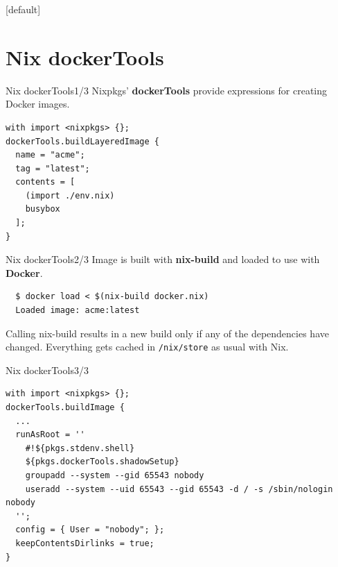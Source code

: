 \documentclass[12pt,aspectratio=169]{beamer}
\begin{document}

[default]


\section{Nix dockerTools}


\begin{frame}[fragile]{Nix dockerTools\hfill1/3}
  Nixpkgs' \textbf{dockerTools} provide expressions for creating Docker images.
  \begin{verbatim}
with import <nixpkgs> {};
dockerTools.buildLayeredImage {
  name = "acme";
  tag = "latest";
  contents = [
    (import ./env.nix)
    busybox
  ];
}
  \end{verbatim}
\end{frame}


\begin{frame}[fragile]{Nix dockerTools\hfill2/3}
  Image is built with \textbf{nix-build} and loaded to use with \textbf{Docker}.
  \begin{verbatim}
  $ docker load < $(nix-build docker.nix)
  Loaded image: acme:latest
  \end{verbatim}
  Calling nix-build results in a new build only if any of the dependencies have changed. Everything gets cached in \texttt{/nix/store} as usual with Nix.
\end{frame}


\begin{frame}[fragile]{Nix dockerTools\hfill3/3}
  \begin{verbatim}
with import <nixpkgs> {};
dockerTools.buildImage {
  ...
  runAsRoot = ''
    #!${pkgs.stdenv.shell}
    ${pkgs.dockerTools.shadowSetup}
    groupadd --system --gid 65543 nobody
    useradd --system --uid 65543 --gid 65543 -d / -s /sbin/nologin nobody
  '';
  config = { User = "nobody"; };
  keepContentsDirlinks = true;
}
  \end{verbatim}
\end{frame}
\end{document}
